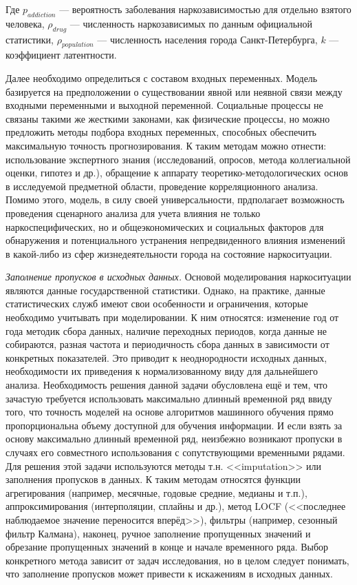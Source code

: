 Где \(p_{addiction}\) --- вероятность заболевания наркозависимостью для отдельно
взятого человека, \(\rho_{drug}\) --- численность наркозависимых по данным
официальной статистики, \(\rho_{population}\) --- численность населения города
Санкт-Петербурга, \(k\) --- коэффициент латентности.

Далее необходимо определиться с составом входных переменных. Модель базируется
на предположении о существовании явной или неявной связи между входными
переменными и выходной переменной. Социальные процессы не связаны такими же
жесткими законами, как физические процессы, но можно предложить методы подбора
входных переменных, способных обеспечить максимальную точность прогнозирования.
К таким методам можно отнести: использование экспертного знания (исследований,
опросов, метода коллегиальной оценки, гипотез и др.), обращение к аппарату
теоретико-методологических основ в исследуемой предметной области, проведение
корреляционного анализа. Помимо этого, модель, в силу своей универсальности,
прдполагает возможность проведения сценарного анализа для учета влияния не
только наркоспецифических, но и общеэкономических и социальных факторов для
обнаружения и потенциального устранения непредвиденного влияния изменений в
какой-либо из сфер жизнедеятельности города на состояние наркоситуации.

\textit{Заполнение пропусков в исходных данных.} Основой моделирования
наркоситуации являются данные государственной статистики.  Однако, на практике,
данные статистических служб имеют свои особенности и ограничения, которые
необходимо учитывать при моделировании. К ним относятся: изменение год от года
методик сбора данных, наличие переходных периодов, когда данные не собираются,
разная частота и периодичность сбора данных в зависимости от конкретных
показателей. Это приводит к неоднородности исходных данных, необходимости их
приведения к нормализованному виду для дальнейшего анализа.  Необходимость
решения данной задачи обусловлена ещё и тем, что зачастую требуется использовать
максимально длинный временной ряд ввиду того, что точность моделей на основе
алгоритмов машинного обучения прямо пропорциональна объему доступной для
обучения информации. И если взять за основу максимально длинный временной ряд,
неизбежно возникают пропуски в случаях его совместного использования с
сопутствующими временными рядами.  Для решения этой задачи используются методы
т.н. <<imputation>> или заполнения пропусков в данных. К таким методам относятся
функции агрегирования (например, месячные, годовые средние, медианы и т.п.),
аппроксимирования (интерполяции, сплайны и др.), метод LOCF (<<последнее
наблюдаемое значение переносится вперёд>>), фильтры (например, сезонный фильтр
Калмана), наконец, ручное заполнение пропущенных значений и обрезание
пропущенных значений в конце и начале временного ряда. Выбор конкретного метода
зависит от задач исследования, но в целом следует понимать, что заполнение
пропусков  может привести к искажениям в исходных данных.

